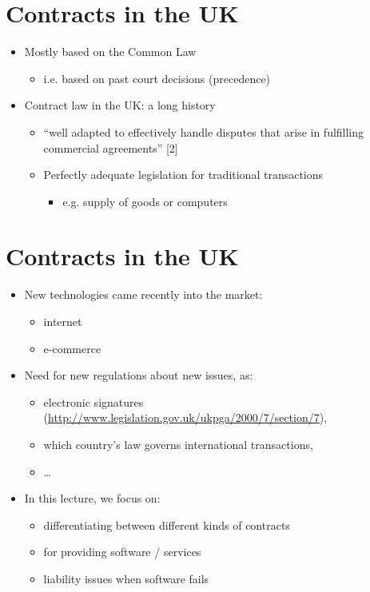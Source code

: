 \documentclass{article}
\begin{document}
\section{Contracts in the UK}
\begin{itemize}
\item Mostly based on the Common Law
\begin{itemize}
\item i.e. based on past court decisions (precedence)
\end{itemize}
\item Contract law in the UK: a long history
\begin{itemize}
\item ``well adapted to effectively handle disputes that arise in fulfilling commercial agreements'' [2]
\item Perfectly adequate legislation for traditional transactions
\begin{itemize}
\item e.g. supply of goods or computers
\end{itemize}
\end{itemize}
\end{itemize}



\section{Contracts in the UK}
\begin{itemize}
\item New technologies came recently into the market: 
\begin{itemize}
\item internet
\item e-commerce
\end{itemize}
\item Need for new regulations about new issues, as:
\begin{itemize}
\item electronic signatures (\url{http://www.legislation.gov.uk/ukpga/2000/7/section/7}),
\item which country's law governs international transactions,
\item \ldots 
\end{itemize}
\item In this lecture, we focus on:
\begin{itemize}
\item differentiating between different kinds of contracts 
\item for providing software / services
\item liability issues when software fails
\end{itemize}
\end{itemize}
\end{document}
